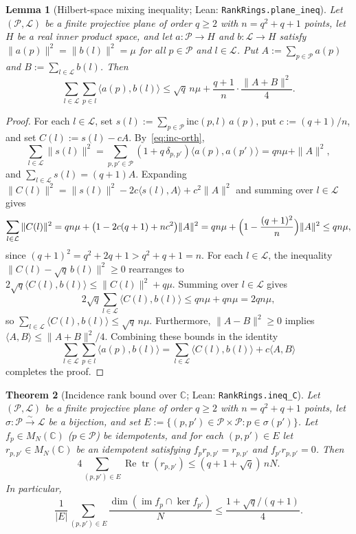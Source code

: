 \documentclass[11pt]{article}
\newtheorem{theorem}{Theorem}[section]
\newtheorem{lemma}[theorem]{Lemma}
\theoremstyle{definition}
\theoremstyle{remark}
\numberwithin{equation}{section}
\DeclareMathOperator{\tr}{tr}
\DeclareMathOperator{\im}{im}
\DeclareMathOperator{\RePart}{Re}
\newcommand{\C}{\mathbb{C}}
\newcommand{\PP}{\mathcal{P}}
\newcommand{\LL}{\mathcal{L}}
\newcommand{\1}{\mathbf{1}}
\newcommand{\code}[1]{{\normalfont\small\texttt{#1}}}
\begin{document}
\begin{lemma}[Hilbert-space mixing inequality; Lean: \code{RankRings.plane\_ineq}]
\label{lem:plane-ineq}
Let $(\PP, \LL)$ be a finite projective plane of order $q \ge 2$ with $n = q^2 + q + 1$ points, let $H$ be a real inner product space, and let $a\colon \PP \to H$ and $b\colon \LL \to H$ satisfy $\|a(p)\|^2 = \|b(l)\|^2 = \mu$ for all $p \in \PP$ and $l \in \LL$. Put $A := \sum_{p \in \PP} a(p)$ and $B := \sum_{l \in \LL} b(l)$. Then
\[
\sum_{l \in \LL} \sum_{p \in l} \langle a(p), b(l) \rangle
\le \sqrt{q}\, n \mu + \frac{q + 1}{n} \cdot \frac{\|A + B\|^2}{4}.
\]
\end{lemma}

\begin{proof}
For each $l \in \LL$, set $s(l) := \sum_{p \in \PP} \mathrm{inc}(p, l)\, a(p)$, put $c := (q + 1)/n$, and set $C(l) := s(l) - c A$. By~\eqref{eq:inc-orth},
\[
\sum_{l \in \LL} \|s(l)\|^2
= \sum_{p, p' \in \PP} (1 + q\,\delta_{p, p'})\langle a(p), a(p') \rangle
= q n \mu + \|A\|^2,
\]
and $\sum_{l \in \LL} s(l) = (q + 1) A$. Expanding $\|C(l)\|^2 = \|s(l)\|^2 - 2c\langle s(l), A\rangle + c^2\|A\|^2$ and summing over $l \in \LL$ gives
\[
\sum_{l \in \LL} \|C(l)\|^2
= q n \mu + \bigl(1 - 2c(q+1) + n c^2\bigr)\|A\|^2
= q n \mu + \Bigl(1 - \frac{(q+1)^2}{n}\Bigr)\|A\|^2
\le q n \mu,
\]
since $(q+1)^2 = q^2 + 2q + 1 > q^2 + q + 1 = n$. For each $l \in \LL$, the inequality $\|C(l) - \sqrt{q}\,b(l)\|^2 \ge 0$ rearranges to $2\sqrt{q}\langle C(l), b(l)\rangle \le \|C(l)\|^2 + q \mu$. Summing over $l \in \LL$ gives
\[
2\sqrt{q} \sum_{l \in \LL} \langle C(l), b(l) \rangle \le q n \mu + q n \mu = 2 q n \mu,
\]
so $\sum_{l \in \LL} \langle C(l), b(l) \rangle \le \sqrt{q}\, n \mu$. Furthermore, $\|A - B\|^2 \ge 0$ implies $\langle A, B \rangle \le \|A + B\|^2 / 4$. Combining these bounds in the identity
\[
\sum_{l \in \LL} \sum_{p \in l} \langle a(p), b(l) \rangle
= \sum_{l \in \LL} \langle C(l), b(l) \rangle + c\langle A, B \rangle
\]
completes the proof.
\end{proof}

\begin{theorem}[Incidence rank bound over $\C$; Lean: \code{RankRings.ineq\_C}]
\label{thm:ineq-C}
Let $(\PP, \LL)$ be a finite projective plane of order $q \ge 2$ with $n = q^2 + q + 1$ points, let $\sigma\colon \PP \xrightarrow{\sim} \LL$ be a bijection, and set $E := \{(p, p') \in \PP \times \PP : p \in \sigma(p')\}$. Let $f_p \in M_N(\C)$ ($p \in \PP$) be idempotents, and for each $(p, p') \in E$ let $r_{p, p'} \in M_N(\C)$ be an idempotent satisfying $f_p r_{p, p'} = r_{p, p'}$ and $f_{p'} r_{p, p'} = 0$. Then
\begin{equation}
\label{eq:ineq-C}
4 \sum_{(p, p') \in E} \RePart\tr(r_{p, p'}) \le (q + 1 + \sqrt{q})\, n N.
\end{equation}
In particular,
\begin{equation}
\label{eq:ineq-C-avg}
\frac{1}{|E|} \sum_{(p, p') \in E} \frac{\dim(\im f_p \cap \ker f_{p'})}{N} \le \frac{1 + \sqrt{q}/(q + 1)}{4}.
\end{equation}
\end{theorem}
\end{document}
